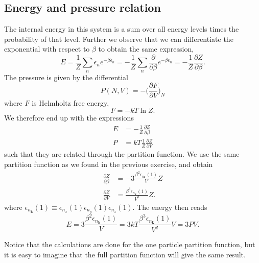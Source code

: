 \documentclass[norsk,a4paper,12pt]{article}
\begin{document}
\subsection{Energy and pressure relation}
The internal energy in this system is a sum over all energy levels times the probability of that level. Further we observe that we can differentiate the exponential with respect to $\beta$ to obtain the same expression,
\begin{equation}
E=\frac{1}{Z}\sum_n\epsilon_ne^{-\beta\epsilon_n}=-\frac{1}{Z}\sum_n\frac{\partial}{\partial\beta}e^{-\beta\epsilon_n}=-\frac{1}{Z}\frac{\partial Z}{\partial\beta}.
\end{equation}
The pressure is given by the differential
\begin{equation}
P(N,V)=-\Big(\frac{\partial F}{\partial V}\Big)_N
\end{equation}
where $F$ is Helmholtz free energy,
\begin{equation}
F=-kT\ln Z.
\end{equation}
We therefore end up with the expressions 
\begin{align}
E&=-\frac{1}{Z}\frac{\partial Z}{\partial\beta}\\
P&=kT\frac{1}{Z}\frac{\partial Z}{\partial V}
\end{align}
such that they are related through the partition function. We use the same partition function as we found in the previous exercise, and obtain
\begin{align}
\frac{\partial Z}{\partial \beta}&=-3\frac{\beta^2\epsilon_{n_{\boldsymbol{k}}}(1)}{V}Z\\
\frac{\partial Z}{\partial V}&=\frac{\beta^3\epsilon_{n_{\boldsymbol{k}}}(1)}{V^2}Z.
\end{align}
where $\epsilon_{n_{\boldsymbol{k}}}(1)\equiv\epsilon_{n_x}(1)\epsilon_{n_y}(1)\epsilon_{n_z}(1)$. The energy then reads
\begin{equation}
E=3\frac{\beta^2\epsilon_{n_{\boldsymbol{k}}}(1)}{V}=3kT\frac{\beta^3\epsilon_{n_{\boldsymbol{k}}}(1)}{V^2}V=3PV.
\end{equation}

Notice that the calculations are done for the one particle partition function, but it is easy to imagine that the full partition function will give the same result. 
\end{document}
